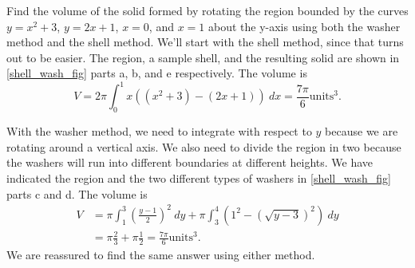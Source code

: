 \begin{example}\label{ex_shell_wash}
Find the volume of the solid formed by rotating the region bounded by the curves $y=x^2+3$, $y=2x+1$, $x=0$, and $x=1$ about the y-axis using both the washer method and the shell method.
\solution
We'll start with the shell method, since that turns out to be easier.  The region, a sample shell, and the resulting solid are shown in \autoref{shell_wash_fig} parts a, b, and e respectively.  The volume is
\[
V=2\pi\int_0^1 x((x^2+3)-(2x+1))\ dx
=\frac{7\pi}6\text{units}^3.
\]

With the washer method, we need to integrate with respect to $y$ because we are rotating around a vertical axis.  We also need to divide the region in two because the washers will run into different boundaries at different heights.  We have indicated the region and the two different types of washers in \autoref{shell_wash_fig} parts c and d.  The volume is
\begin{align*}
V&=\pi\int_1^3\left(\frac{y-1}2\right)^2\ dy
+\pi\int_3^4\left(1^2-\left(\sqrt{y-3}\right)^2\right)\ dy\\
&=\pi\frac23+\pi\frac12
=\frac{7\pi}6\text{units}^3.
\end{align*}
We are reassured to find the same answer using either method.
\end{example}

